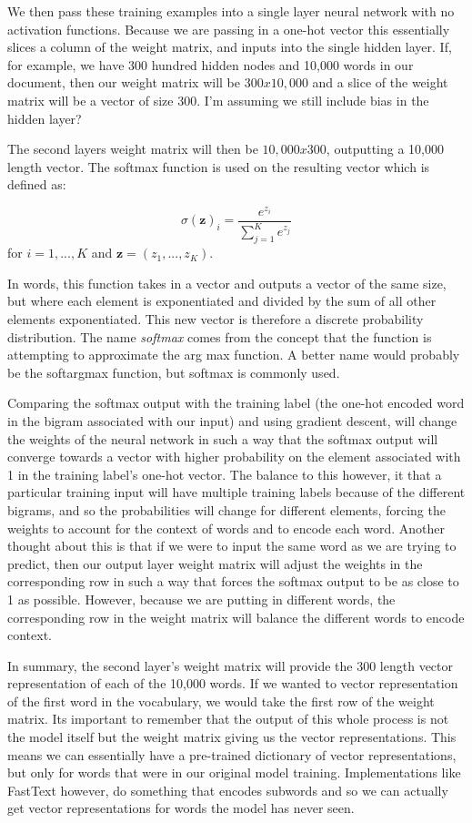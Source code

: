 We then pass these training examples into a single layer neural network with no activation functions. Because we are passing in a one-hot vector this essentially slices a column of the weight matrix, and inputs into the single hidden layer. If, for example, we have 300 hundred hidden nodes and 10,000 words in our document, then our weight matrix will be $300x10,000$ and a slice of the weight matrix will be a vector of size 300. I'm assuming we still include bias in the hidden layer? 

The second layers weight matrix will then be $10,000x300$, outputting a 10,000 length vector. The softmax function is used on the resulting vector which is defined as:

\begin{equation}
\sigma(\mathbf{z})_i = \frac{e^{z_i}}{\sum_{j=1}^{K}e^{z_j}} 
\end{equation}
\noindent for $i=1,...,K$ and $\mathbf{z} = (z_1, ...,z_K)$.

In words, this function takes in a vector and outputs a vector of the same size, but where each element is exponentiated and divided by the sum of all other elements exponentiated. This new vector is therefore a discrete probability distribution. The name \emph{softmax} comes from the concept that the function is attempting to approximate the arg max function. A better name would probably be the softargmax function, but softmax is commonly used.

Comparing the softmax output with the training label (the one-hot encoded word in the bigram associated with our input) and using gradient descent, will change the weights of the neural network in such a way that the softmax output will converge towards a vector with higher probability on the element associated with 1 in the training label's one-hot vector. The balance to this however, it that a particular training input will have multiple training labels because of the different bigrams, and so the probabilities will change for different elements, forcing the weights to account for the context of words and to encode each word. Another thought about this is that if we were to input the same word as we are trying to predict, then our output layer weight matrix will adjust the weights in the corresponding row in such a way that forces the softmax output to be as close to 1 as possible. However, because we are putting in different words, the corresponding row in the weight matrix will balance the different words to encode context.

In summary, the second layer's weight matrix will provide the 300 length vector representation of each of the 10,000 words. If we wanted to vector representation of the first word in the vocabulary, we would take the first row of the weight matrix. Its important to remember that the output of this whole process is not the model itself but the weight matrix giving us the vector representations. This means we can essentially have a pre-trained dictionary of vector representations, but only for words that were in our original model training. Implementations like FastText however, do something that encodes subwords and so we can actually get vector representations for words the model has never seen. 

